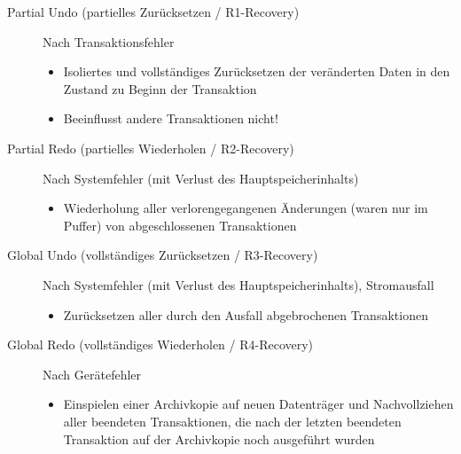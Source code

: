 \documentclass{lehramt-informatik-haupt}
\begin{document}
\begin{description}

%

\item[Partial Undo (partielles Zurücksetzen / R1-Recovery)]

Nach Transaktionsfehler

\begin{itemize}
\item Isoliertes und vollständiges Zurücksetzen der veränderten Daten in
den Zustand zu Beginn der Transaktion

\item Beeinflusst andere Transaktionen nicht!
\end{itemize}

%

\item[Partial Redo (partielles Wiederholen / R2-Recovery)]

Nach Systemfehler (mit Verlust des Hauptspeicherinhalts)

\begin{itemize}
\item Wiederholung aller verlorengegangenen Änderungen (waren nur im
Puffer) von abgeschlossenen Transaktionen
\end{itemize}

%

\item[Global Undo (vollständiges Zurücksetzen / R3-Recovery)]

Nach Systemfehler (mit Verlust des Hauptspeicherinhalts), \zB
Stromausfall

\begin{itemize}
\item Zurücksetzen aller durch den Ausfall abgebrochenen Transaktionen
\end{itemize}

%

\item[Global Redo (vollständiges Wiederholen / R4-Recovery)]

Nach Gerätefehler

\begin{itemize}
\item Einspielen einer Archivkopie auf neuen Datenträger und
Nachvollziehen aller beendeten Transaktionen, die nach der letzten
beendeten Transaktion auf der Archivkopie noch ausgeführt wurden
\end{itemize}

\end{description}
\end{document}
